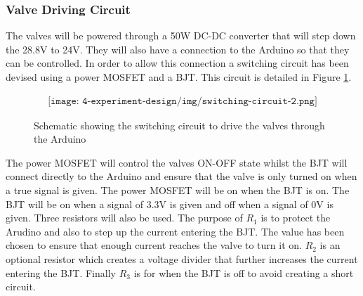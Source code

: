 \subsubsection{Valve Driving Circuit}
The valves will be powered through a 50W DC-DC converter that will step down the 28.8V to 24V. They will also have a connection to the Arduino so that they can be controlled. In order to allow this connection a switching circuit has been devised using a power MOSFET and a BJT. This circuit is detailed in Figure \ref{fig:switchcir}.

\begin{figure}[H]
    \begin{align*}
        \texttt{[image: 4-experiment-design/img/switching-circuit-2.png]}
    \end{align*}
    \caption{Schematic showing the switching circuit to drive the valves through the Arduino}\label{fig:switchcir}
\end{figure}

The power MOSFET will control the valves ON-OFF state whilst the BJT will connect directly to the Arduino and ensure that the valve is only turned on when a true signal is given. The power MOSFET will be on when the BJT is on. The BJT will be on when a signal of 3.3V is given and off when a signal of 0V is given. Three resistors will also be used. The purpose of $R_{1}$ is to protect the Arudino and also to step up the current entering the BJT. The value has been chosen to ensure that enough current reaches the valve to turn it on. $R_{2}$ is an optional resistor which creates a voltage divider that further increases the current entering the BJT. Finally $R_{3}$ is for when the BJT is off to avoid creating a short circuit. 


\raggedbottom